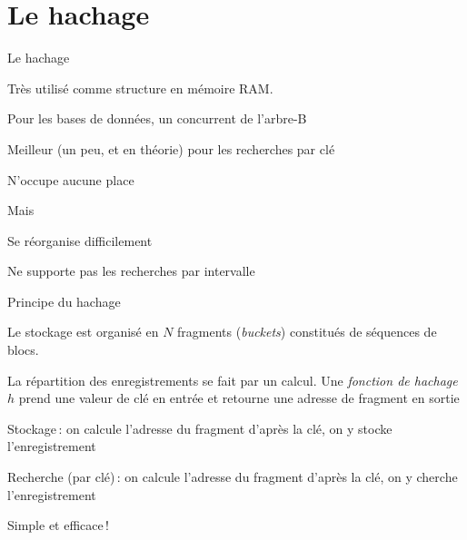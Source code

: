 

\section{Le hachage}
\begin{frame}{Le hachage}

Très utilisé comme structure en mémoire RAM. 

\vfill

Pour les bases de données, un concurrent de l'arbre-B
\begin{redbullet}
  \item \alert{Meilleur} (un peu, et en théorie) pour les recherches par clé
  \item \alert{N'occupe aucune place}
\end{redbullet}

\vfill

Mais

\vfill

\begin{redbullet}
  \item Se réorganise difficilement
  \item Ne supporte pas les recherches par intervalle
\end{redbullet}
  

\end{frame}
\begin{frame}{Principe du hachage}

Le stockage est organisé en $N$ \alert{fragments} (\textit{buckets})
constitués de séquences de blocs.

\vfill

La répartition des enregistrements se fait par un \alert{calcul}. Une \textit{fonction de hachage} $h$ prend une
         valeur de clé en entrée et retourne une adresse de fragment en sortie



\vfill
\begin{redbullet}
  \item \alert{Stockage}\,: on calcule l'adresse du fragment d'après la clé, on y stocke l'enregistrement
          
            \item \alert{Recherche (par clé)}\,:  on calcule l'adresse du fragment d'après la clé,
                on y cherche l'enregistrement
     
\end{redbullet}

\vfill

Simple et efficace\,!

\end{frame}
